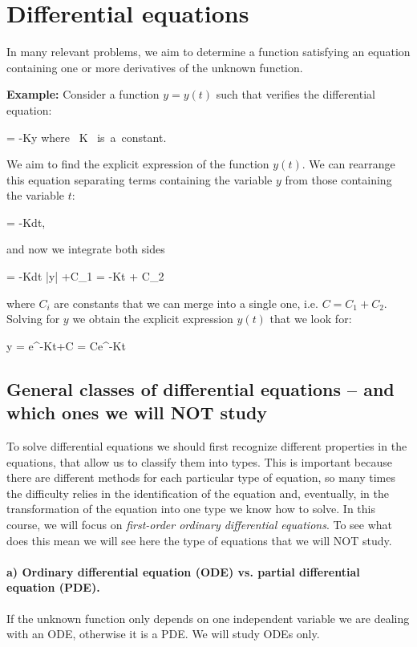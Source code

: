 
\section{Differential equations}

In many relevant problems, we aim to determine a function satisfying an
equation containing one or more derivatives of the unknown function.

{\bf Example:} Consider a function $y=y(t)$ such that verifies the differential equation:

\bnn
{} = -Ky \qquad \mbox{where } K \mbox{ is a constant.}
\enn

We aim to find the explicit expression of the function $y(t)$. We can rearrange this equation separating terms containing the variable $y$ from those containing the variable $t$:

\bnn {} = -Kdt, \enn

and now we integrate both sides

\bnn \int {} = \int -Kdt \quad \rightarrow \quad \ln |y| +C_1 = -Kt + C_2\enn

where $C_i$ are constants that we can merge into a single one, i.e. $C = C_1+C_2$. Solving for $y$ we obtain the explicit expression $y(t)$ that we look for:

\bnn y = e^{-Kt+C} = Ce^{-Kt} \enn

\subsection{General classes of differential equations -- and which ones we will NOT study}

To solve differential equations we should first recognize different properties in the equations, that allow us to classify them into types. This is important because there are different methods for each particular type of equation, so many times the difficulty relies in the identification of the equation and, eventually, in the transformation of the equation into one type we know how to solve. In this course, we will focus on {\em first-order ordinary differential equations}. To see what does this mean we will see here the type of equations that we will NOT study.

\paragraph{a) Ordinary differential equation (ODE) vs. partial differential equation (PDE).} 
If the unknown function only depends on one independent variable we are dealing with an ODE, otherwise it is a PDE. We will study ODEs only.

